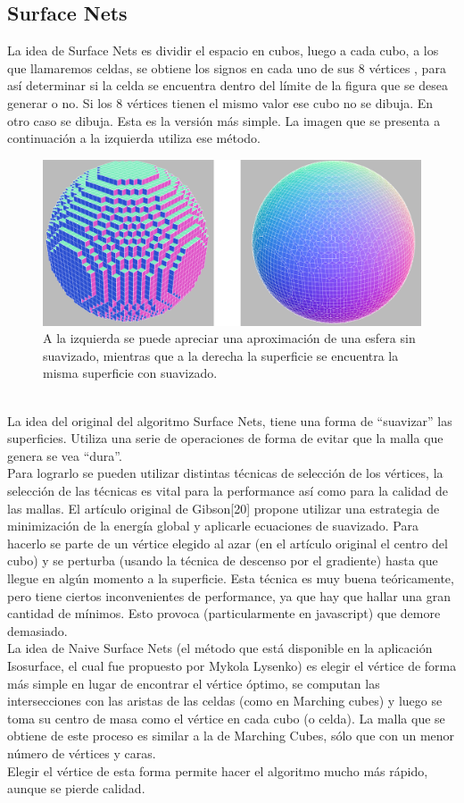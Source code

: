 \documentclass[12pt]{article}
\begin{document}
\subsection{Surface Nets}
La idea de Surface Nets es dividir el espacio en cubos, luego a cada cubo, a los que llamaremos celdas, se obtiene los signos en cada uno de sus 8 vértices , para así determinar si la celda se encuentra dentro del límite de la figura que se desea generar o no. Si los 8 vértices tienen el mismo valor ese cubo no se dibuja. En otro caso se dibuja. Esta es la versión más simple. La imagen que se presenta a continuación a la izquierda utiliza ese método.
\begin{figure}[h]
\includegraphics[width =\linewidth,center]{snc.png}
\caption{ A la izquierda se puede apreciar una aproximación de una esfera sin suavizado, mientras que a la derecha la superficie se encuentra la misma superficie con suavizado.}
\label{ fig : surface }
\end{figure}
\\La idea del original del algoritmo Surface Nets\cite{surfacenets}, tiene una forma de “suavizar” las superficies. Utiliza una serie de operaciones de forma de evitar que la malla que genera se vea “dura”.
\\Para lograrlo se pueden utilizar distintas técnicas de selección de los vértices, la selección de las técnicas es vital para la performance así como para la calidad de las mallas. El artículo original de Gibson[20]  propone utilizar una estrategia de minimización de la energía global y aplicarle ecuaciones de suavizado. Para hacerlo se parte de un vértice elegido al azar (en el artículo original el centro del cubo)  y se perturba (usando la técnica de descenso por el gradiente) hasta que llegue en algún momento a la superficie. Esta técnica es muy buena teóricamente, pero tiene ciertos inconvenientes de performance, ya que hay que hallar una gran cantidad de mínimos. Esto provoca (particularmente en javascript) que demore demasiado.
\\La idea de Naive Surface Nets (el método que está disponible en la aplicación Isosurface, el cual fue propuesto por Mykola Lysenko\cite{mykola2}) es elegir el vértice de forma más simple  en lugar de encontrar el vértice óptimo, se computan las intersecciones con las aristas de las celdas (como en Marching cubes) y luego se toma su centro de masa como el vértice en cada cubo (o celda). La malla que se obtiene de este proceso es similar a la de Marching Cubes, sólo que con un menor número de vértices y caras. 
\\Elegir el vértice de esta forma permite hacer el algoritmo mucho más rápido, aunque se pierde calidad.
\end{document}
